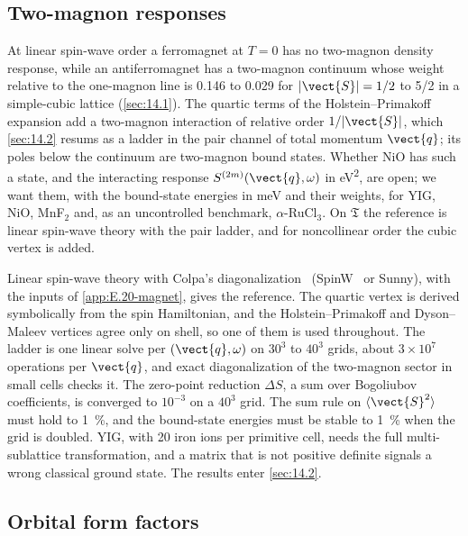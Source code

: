 \subsection{Two-magnon responses}

At linear spin-wave order a ferromagnet at $T = 0$ has no two-magnon density response, while an antiferromagnet has a two-magnon continuum whose weight relative to the one-magnon line is 0.146 to 0.029 for $|\vect{S}| = 1/2$ to 5/2 in a simple-cubic lattice (\cref{sec:14.1}). The quartic terms of the Holstein--Primakoff expansion add a two-magnon interaction of relative order $1/|\vect{S}|$, which \cref{sec:14.2} resums as a ladder in the pair channel of total momentum $\vect{q}$; its poles below the continuum are two-magnon bound states. Whether NiO has such a state, and the interacting response $S^{(2m)}(\vect{q},\omega)$ in \si{eV^2}, are open; we want them, with the bound-state energies in meV and their weights, for YIG, NiO, MnF$_2$ and, as an uncontrolled benchmark, $\alpha$-RuCl$_3$. On $\mathfrak{T}$ the reference is linear spin-wave theory with the pair ladder, and for noncollinear order the cubic vertex is added.

Linear spin-wave theory with Colpa's diagonalization~\cite{colpa1978diagonalization} (SpinW~\cite{toth2015linear} or Sunny), with the inputs of \cref{app:E.20-magnet}, gives the reference. The quartic vertex is derived symbolically from the spin Hamiltonian, and the Holstein--Primakoff and Dyson--Maleev vertices agree only on shell, so one of them is used throughout. The ladder is one linear solve per $(\vect{q},\omega)$ on $30^3$ to $40^3$ grids, about $3\times10^7$ operations per $\vect{q}$, and exact diagonalization of the two-magnon sector in small cells checks it. The zero-point reduction $\Delta S$, a sum over Bogoliubov coefficients, is converged to $10^{-3}$ on a $40^3$ grid. The sum rule on $\langle\vect{S}^2\rangle$ must hold to \SI{1}{\percent}, and the bound-state energies must be stable to \SI{1}{\percent} when the grid is doubled. YIG, with 20 iron ions per primitive cell, needs the full multi-sublattice transformation, and a matrix that is not positive definite signals a wrong classical ground state. The results enter \cref{sec:14.2}.

\subsection{Orbital form factors}

